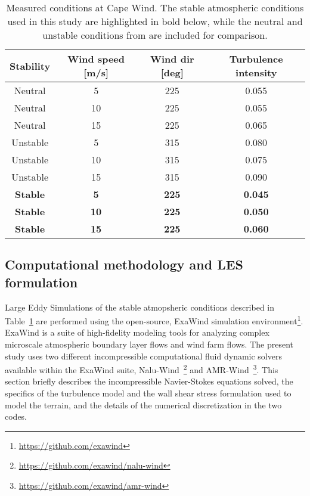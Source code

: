 \begin{table}
\caption{\label{tab:CapeWindMeasurements} Measured conditions at Cape
  Wind.  The stable atmospheric conditions used in this study are
  highlighted in bold below, while the neutral and unstable conditions
  from \cite{cheung2020large} are included for comparison.} \centering
\begin{tabular}{cccc}
  \hline
  Stability    & Wind speed [m/s] & Wind dir [deg] & Turbulence intensity \\
  \hline
  Neutral      & 5                & 225            & 0.055           \\
  Neutral      & 10               & 225            & 0.055           \\
  Neutral      & 15               & 225            & 0.065           \\
  Unstable     & 5                & 315            & 0.080           \\
  Unstable     & 10               & 315            & 0.075           \\
  Unstable     & 15               & 315            & 0.090           \\
  \bf{Stable}  & \bf{5}           & \bf{225}       & \bf{0.045}      \\
  \bf{Stable}  & \bf{10}          & \bf{225}       & \bf{0.050}      \\
  \bf{Stable}  & \bf{15}          & \bf{225}       & \bf{0.060}      \\
\hline
\end{tabular}
\end{table}


\subsection{Computational methodology and LES formulation}

Large Eddy Simulations of the stable atmopsheric conditions described in
Table~\ref{tab:CapeWindMeasurements} are performed using the open-source,
ExaWind simulation environment\footnote{\url{https://github.com/exawind}}.
ExaWind is a suite of high-fidelity modeling tools for analyzing complex
microscale atmospheric boundary layer flows and wind farm flows. The present
study uses two different incompressible computational fluid dynamic solvers
available within the ExaWind suite,
Nalu-Wind~\footnote{\url{https://github.com/exawind/nalu-wind}} and
AMR-Wind~\footnote{\url{https://github.com/exawind/amr-wind}}. This section
briefly describes the incompressible Navier-Stokes equations solved,
the specifics of the turbulence model and the wall shear stress
formulation used to model the terrain, and the details of the numerical
discretization in the two codes.

